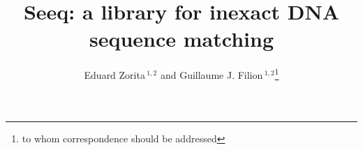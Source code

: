 \documentclass{bioinfo}
\begin{document}

\title[short Title]{Seeq: a library for inexact DNA sequence matching}
\author[Zorita \textit{et~al}]{Eduard Zorita\,$^{1,2}$ and Guillaume J. Filion\,$^{1,2}$\footnote{to whom correspondence should be addressed}}
\address{$^{1}$Genome Architecture, Gene Regulation, Stem Cells and
  Cancer Programme, Centre for Genomic Regulation (CRG), Dr. Aiguader
  88, 08003 Barcelona, Spain\\
$^{2}$Universitat Pompeu Fabra (UPF), 08002 Barcelona, Spain}



\maketitle
\end{document}
